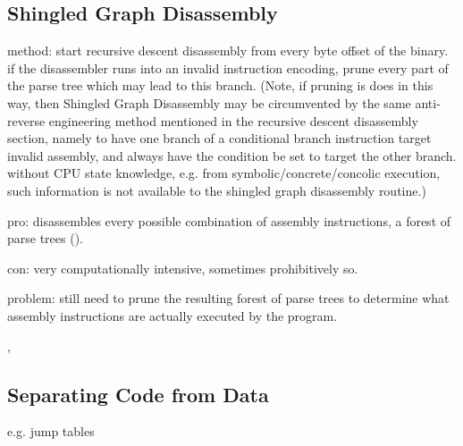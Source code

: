 
\subsection{Shingled Graph Disassembly}

method: start recursive descent disassembly from every byte offset of the binary. if the disassembler runs into an invalid instruction encoding, prune every part of the parse tree which may lead to this branch. (Note, if pruning is does in this way, then Shingled Graph Disassembly may be circumvented by the same anti-reverse engineering method mentioned in the recursive descent disassembly section, namely to have one branch of a conditional branch instruction target invalid assembly, and always have the condition be set to target the other branch. without CPU state knowledge, e.g. from symbolic/concrete/concolic execution, such information is not available to the shingled graph disassembly routine.)

pro: disassembles every possible combination of assembly instructions, a forest of parse trees ().

con: very computationally intensive, sometimes prohibitively so.

problem: still need to prune the resulting forest of parse trees to determine what assembly instructions are actually executed by the program.


\cite{singled_graph_disassembly}, \cite{superset_disassembly}


\subsection{Separating Code from Data}
\label{sec:separating-code-from-data}

e.g. jump tables



